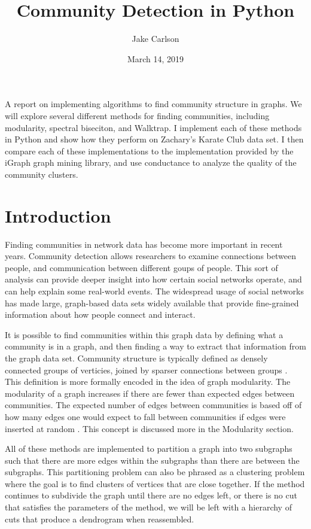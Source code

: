 \documentclass{article}
\begin{document}
\title{Community Detection in Python}
\author{Jake Carlson}
\date{March 14, 2019}
\maketitle

\abstract
A report on implementing algorithms to find community structure in graphs. We will explore several different methods for finding communities, including modularity, spectral biseciton, and Walktrap. I implement each of these methods in Python and show how they perform on Zachary's Karate Club data set. I then compare each of these implementations to the implementation provided by the iGraph graph mining library, and use conductance to analyze the quality of the community clusters.
\newpage

\tableofcontents
\newpage

\section{Introduction}
Finding communities in network data has become more important in recent years. Community detection allows researchers to examine connections between people, and communication between different goups of people. This sort of analysis can provide deeper insight into how certain social networks operate, and can help explain some real-world events. The widespread usage of social networks has made large, graph-based data sets widely available that provide fine-grained information about how people connect and interact.
\par
It is possible to find communities within this graph data by defining what a community is in a graph, and then finding a way to extract that information from the graph data set. Community structure is typically defined as densely connected groups of verticies, joined by sparser connections between groups \cite{Newman2004}. This definition is more formally encoded in the idea of graph modularity. The modularity of a graph increases if there are fewer than expected edges between communities. The expected number of edges between communities is based off of how many edges one would expect to fall between communities if edges were inserted at random \cite{Newman2006}. This concept is discussed more in the Modularity section.
\par
All of these methods are implemented to partition a graph into two subgraphs such that there are more edges within the subgraphs than there are between the subgraphs. This partitioning problem can also be phrased as a clustering problem where the goal is to find clusters of vertices that are close together. If the method continues to subdivide the graph until there are no edges left, or there is no cut that satisfies the parameters of the method, we will be left with a hierarchy of cuts that produce a dendrogram when reassembled.
\end{document}

